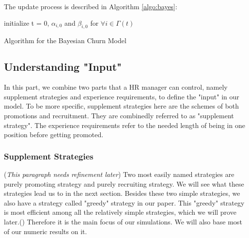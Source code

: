 \documentclass[tcn = 37075, sheet = true, abstract = true]{mcmthesis}
\begin{document}
The update process is described in Algorithm \ref{algo:bayes}:

\begin{algorithm}[H]

 initialize t = 0, $\alpha_{i,0}$ and $\beta_{i,0}$ for $\forall i \in \Gamma(t)$\;
 \caption{Algorithm for the Bayesian Churn Model}
 \label{algo:bayes}
\end{algorithm}

\subsection{Understanding "Input"}

In this part, we combine two parts that a HR manager can control, namely supplement strategies and experience requirements, to define the "input" in our model. To be more specific, supplement strategies here are the schemes of both promotions and recruitment. They are combinedly referred to as "supplement strategy". The experience requirements refer to the needed length of being in one position before getting promoted.

\subsubsection{Supplement Strategies}

(\textit{This paragraph needs refinement later}) Two most easily named strategies are purely promoting strategy and purely recruiting strategy. We will see what these strategies lead us to in the next section. Besides these two simple strategies, we also have a strategy called "greedy" strategy in our paper. This "greedy" strategy is most efficient among all the relatively simple strategies, which we will prove later.(\text{!!!!!!!!!!!!!!!!!!!!!!!!!!}) Therefore it is the main focus of our simulations. We will also base most of our numeric results on it.
\end{document}
